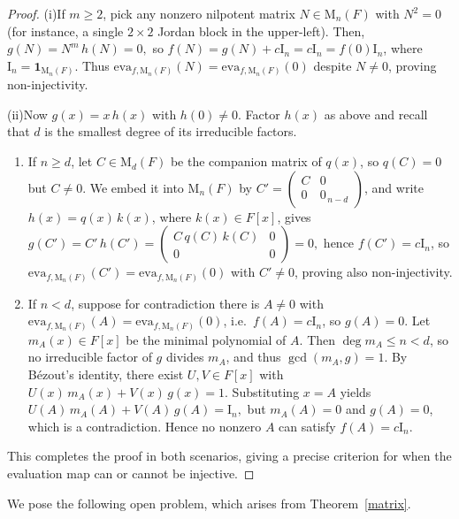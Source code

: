 \documentclass{amsart}
\theoremstyle{definition}
\begin{document}
	\begin{proof}
		(i)\quad If $m\ge2$, pick any nonzero nilpotent matrix $N\in \mathrm{M}_n(F)$ with $N^2=0$ (for instance, a single $2\times2$ Jordan block in the upper-left).  Then, $g(N)=N^m\,h(N)=0,$
		so $f(N)=g(N)+c\mathrm{I}_n=c\mathrm{I}_n=f(0)\mathrm{I}_n$, where $\mathrm{I}_n=\mathbf{1}_{\mathrm{M}_n(F)}$.
		Thus $\mathrm{eva}_{f,\mathrm{M}_n(F)}(N)=\mathrm{eva}_{f,\mathrm{M}_n(F)}(0)$ despite $N\neq0$, proving non-injectivity.
		
		(ii)\quad Now $g(x)=x\,h(x)$ with $h(0)\neq0$.  Factor $h(x)$ as above and recall that $d$ is the smallest degree of its irreducible factors.
		
		\begin{enumerate}[{\upshape(a)}]
			\item If $n\ge d$, let $C\in \mathrm{M}_d(F)$ be the companion matrix of $q(x)$, so $q(C)=0$ but $C\neq0$.  We embed it into $\mathrm{M}_n(F)$ by
			$C'=\begin{pmatrix}C&0\\0&0_{\,n-d}\end{pmatrix}$, and write $h(x)=q(x)\,k(x)$, where $k(x)\in F[x]$, gives
			$g(C')=C'\,h(C')=\begin{pmatrix}C\,q(C)\,k(C)&0\\0&0\end{pmatrix}=0,$			hence $f(C')=c\mathrm{I}_n$, so $\mathrm{eva}_{f,\mathrm{M}_n(F)}(C')=\mathrm{eva}_{f,\mathrm{M}_n(F)}(0)$ with $C'\neq0$, proving also non-injectivity.
			
			\item If $n<d$, suppose for contradiction there is $A\neq0$ with $\mathrm{eva}_{f,\mathrm{M}_n(F)}(A)=\mathrm{eva}_{f,\mathrm{M}_n(F)}(0)$, i.e.\ $f(A)=c\mathrm{I}_n$, so $g(A)=0$.  Let $m_A(x)\in F[x]$ be the minimal polynomial of $A$.  Then $\deg m_A\le n<d$, so no irreducible factor of $g$ divides $m_A$, and thus $\gcd(m_A,g)=1$.  By Bézout’s identity, there exist $U,V\in F[x]$ with
			$U(x)\,m_A(x)+V(x)\,g(x)=1.$
			Substituting $x=A$ yields
			$U(A)\,m_A(A)+V(A)\,g(A)=\mathrm{I}_n,$
			but $m_A(A)=0$ and $g(A)=0$, which is a contradiction.  Hence no nonzero $A$ can satisfy $f(A)=c\mathrm{I}_n$.
		\end{enumerate}
		This completes the proof in both scenarios, giving a precise criterion for when the evaluation map can or cannot be injective.
	\end{proof}
	
	We pose the following open problem, which arises from Theorem~\ref{matrix}.
	
\end{document}
